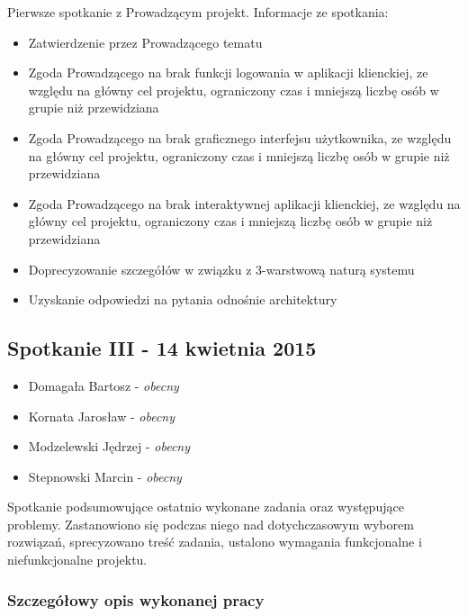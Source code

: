 \par{Pierwsze spotkanie z Prowadzącym projekt. Informacje ze spotkania:}

\begin{itemize}
\item Zatwierdzenie przez Prowadzącego tematu
\item Zgoda Prowadzącego na brak funkcji logowania w aplikacji klienckiej, ze względu na główny cel projektu, ograniczony czas i mniejszą liczbę osób w grupie niż przewidziana
\item Zgoda Prowadzącego na brak graficznego interfejsu użytkownika, ze względu na główny cel projektu, ograniczony czas i mniejszą liczbę osób w grupie niż przewidziana
\item Zgoda Prowadzącego na brak interaktywnej aplikacji klienckiej, ze względu na główny cel projektu, ograniczony czas i mniejszą liczbę osób w grupie niż przewidziana
\item Doprecyzowanie szczegółów w związku z 3-warstwową naturą systemu
\item Uzyskanie odpowiedzi na pytania odnośnie architektury
\end{itemize}

\subsection[Spotkanie III - 14 kwietnia 2015]{Spotkanie III - 14 kwietnia 2015}

\begin{itemize}
\item Domagała Bartosz - \textit{obecny}
\item Kornata Jarosław - \textit{obecny}
\item Modzelewski Jędrzej - \textit{obecny}
\item Stepnowski Marcin - \textit{obecny}
\end{itemize}

\par{Spotkanie podsumowujące ostatnio wykonane zadania oraz występujące problemy. Zastanowiono się podczas niego nad dotychczasowym wyborem rozwiązań, sprecyzowano treść zadania, ustalono wymagania funkcjonalne i niefunkcjonalne projektu.}

\subsubsection*[Szczegółowy opis wykonanej pracy]{Szczegółowy opis wykonanej pracy}

